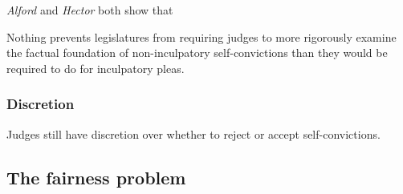 \textit{Alford} and \textit{Hector} both show that 

Nothing prevents legislatures from requiring judges to more rigorously examine the factual foundation of non-inculpatory self-convictions than they would be required to do for inculpatory pleas. 

\subsubsection{Discretion}

Judges still have discretion over whether to reject or accept self-convictions.

\subsection{The fairness problem}